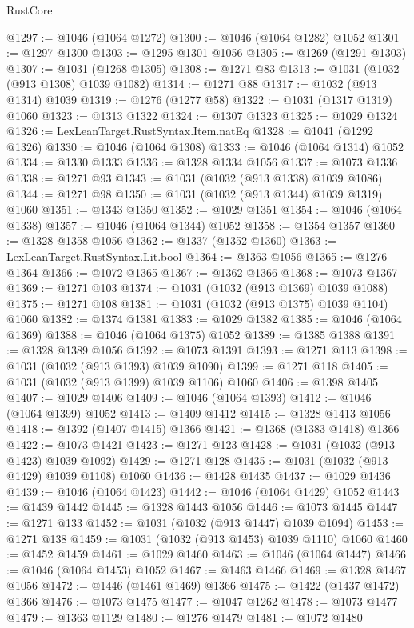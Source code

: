 \begin{lexlean}{RustCore}
\begin{coremodule}
@1297 := @1046 (@1064 @1272)
@1300 := @1046 (@1064 @1282) @1052
@1301 := @1297 @1300
@1303 := @1295 @1301 @1056
@1305 := @1269 (@1291 @1303)
@1307 := @1031 (@1268 @1305)
@1308 := @1271 @83
@1313 := @1031 (@1032 (@913 @1308) @1039 @1082)
@1314 := @1271 @88
@1317 := @1032 (@913 @1314) @1039
@1319 := @1276 (@1277 @58)
@1322 := @1031 (@1317 @1319) @1060
@1323 := @1313 @1322
@1324 := @1307 @1323
@1325 := @1029 @1324
@1326 := LexLeanTarget.RustSyntax.Item.natEq
@1328 := @1041 (@1292 @1326)
@1330 := @1046 (@1064 @1308)
@1333 := @1046 (@1064 @1314) @1052
@1334 := @1330 @1333
@1336 := @1328 @1334 @1056
@1337 := @1073 @1336
@1338 := @1271 @93
@1343 := @1031 (@1032 (@913 @1338) @1039 @1086)
@1344 := @1271 @98
@1350 := @1031 (@1032 (@913 @1344) @1039 @1319) @1060
@1351 := @1343 @1350
@1352 := @1029 @1351
@1354 := @1046 (@1064 @1338)
@1357 := @1046 (@1064 @1344) @1052
@1358 := @1354 @1357
@1360 := @1328 @1358 @1056
@1362 := @1337 (@1352 @1360)
@1363 := LexLeanTarget.RustSyntax.Lit.bool
@1364 := @1363 @1056
@1365 := @1276 @1364
@1366 := @1072 @1365
@1367 := @1362 @1366
@1368 := @1073 @1367
@1369 := @1271 @103
@1374 := @1031 (@1032 (@913 @1369) @1039 @1088)
@1375 := @1271 @108
@1381 := @1031 (@1032 (@913 @1375) @1039 @1104) @1060
@1382 := @1374 @1381
@1383 := @1029 @1382
@1385 := @1046 (@1064 @1369)
@1388 := @1046 (@1064 @1375) @1052
@1389 := @1385 @1388
@1391 := @1328 @1389 @1056
@1392 := @1073 @1391
@1393 := @1271 @113
@1398 := @1031 (@1032 (@913 @1393) @1039 @1090)
@1399 := @1271 @118
@1405 := @1031 (@1032 (@913 @1399) @1039 @1106) @1060
@1406 := @1398 @1405
@1407 := @1029 @1406
@1409 := @1046 (@1064 @1393)
@1412 := @1046 (@1064 @1399) @1052
@1413 := @1409 @1412
@1415 := @1328 @1413 @1056
@1418 := @1392 (@1407 @1415) @1366
@1421 := @1368 (@1383 @1418) @1366
@1422 := @1073 @1421
@1423 := @1271 @123
@1428 := @1031 (@1032 (@913 @1423) @1039 @1092)
@1429 := @1271 @128
@1435 := @1031 (@1032 (@913 @1429) @1039 @1108) @1060
@1436 := @1428 @1435
@1437 := @1029 @1436
@1439 := @1046 (@1064 @1423)
@1442 := @1046 (@1064 @1429) @1052
@1443 := @1439 @1442
@1445 := @1328 @1443 @1056
@1446 := @1073 @1445
@1447 := @1271 @133
@1452 := @1031 (@1032 (@913 @1447) @1039 @1094)
@1453 := @1271 @138
@1459 := @1031 (@1032 (@913 @1453) @1039 @1110) @1060
@1460 := @1452 @1459
@1461 := @1029 @1460
@1463 := @1046 (@1064 @1447)
@1466 := @1046 (@1064 @1453) @1052
@1467 := @1463 @1466
@1469 := @1328 @1467 @1056
@1472 := @1446 (@1461 @1469) @1366
@1475 := @1422 (@1437 @1472) @1366
@1476 := @1073 @1475
@1477 := @1047 @1262
@1478 := @1073 @1477
@1479 := @1363 @1129
@1480 := @1276 @1479
@1481 := @1072 @1480

\end{coremodule}
\end{lexlean}
